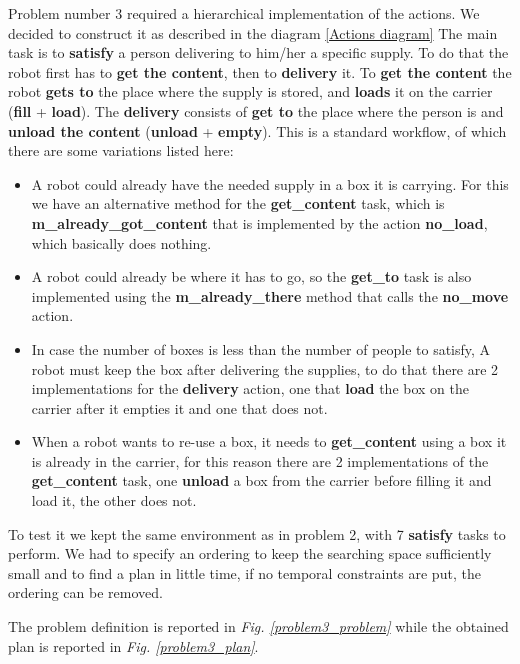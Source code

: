 Problem number 3 required a hierarchical implementation of the actions.
We decided to construct it as described in the diagram \ref{Actions diagram}
The main task is to \textbf{satisfy} a person delivering to him/her a specific supply.
To do that the robot first has to \textbf{get the content}, then to \textbf{delivery} it.
To \textbf{get the content} the robot \textbf{gets to} the place where the supply is stored, and \textbf{loads} it on the carrier (\textbf{fill} + \textbf{load}).
The \textbf{delivery} consists of \textbf{get to} the place where the person is and \textbf{unload the content} (\textbf{unload} + \textbf{empty}).
This is a standard workflow, of which there are some variations listed here:
\begin{itemize}
    \item A robot could already have the needed supply in a box it is carrying. For this we have an alternative method for the \textbf{get\_content} task, which is \textbf{m\_already\_got\_content} that is implemented by the action \textbf{no\_load}, which basically does nothing.
    \item A robot could already be where it has to go, so the \textbf{get\_to} task is also implemented using the \textbf{m\_already\_there} method that calls the \textbf{no\_move} action.
    \item In case the number of boxes is less than the number of people to satisfy, A robot must keep the box after delivering the supplies, to do that there are 2 implementations for the \textbf{delivery} action, one that \textbf{load} the box on the carrier after it empties it and one that does not.
    \item When a robot wants to re-use a box, it needs to \textbf{get\_content} using a box it is already in the carrier, for this reason there are 2 implementations of the \textbf{get\_content} task, one \textbf{unload} a box from the carrier before filling it and load it, the other does not.
\end{itemize} 
To test it we kept the same environment as in problem 2, with 7 \textbf{satisfy} tasks to perform.
We had to specify an ordering to keep the searching space sufficiently small and to find a plan in little time, if no temporal constraints are put, the ordering can be removed.

The problem definition is reported in \textit{Fig. \ref{problem3_problem}} while the obtained plan is reported in \textit{Fig. \ref{problem3_plan}}.